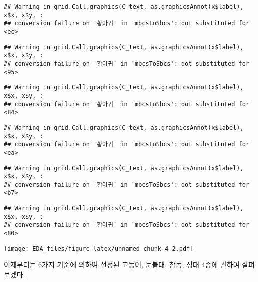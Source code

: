 \documentclass[
]{article}
\begin{document}
\begin{verbatim}
## Warning in grid.Call.graphics(C_text, as.graphicsAnnot(x$label), x$x, x$y, :
## conversion failure on '황아귀' in 'mbcsToSbcs': dot substituted for <ec>
\end{verbatim}

\begin{verbatim}
## Warning in grid.Call.graphics(C_text, as.graphicsAnnot(x$label), x$x, x$y, :
## conversion failure on '황아귀' in 'mbcsToSbcs': dot substituted for <95>
\end{verbatim}

\begin{verbatim}
## Warning in grid.Call.graphics(C_text, as.graphicsAnnot(x$label), x$x, x$y, :
## conversion failure on '황아귀' in 'mbcsToSbcs': dot substituted for <84>
\end{verbatim}

\begin{verbatim}
## Warning in grid.Call.graphics(C_text, as.graphicsAnnot(x$label), x$x, x$y, :
## conversion failure on '황아귀' in 'mbcsToSbcs': dot substituted for <ea>
\end{verbatim}

\begin{verbatim}
## Warning in grid.Call.graphics(C_text, as.graphicsAnnot(x$label), x$x, x$y, :
## conversion failure on '황아귀' in 'mbcsToSbcs': dot substituted for <b7>
\end{verbatim}

\begin{verbatim}
## Warning in grid.Call.graphics(C_text, as.graphicsAnnot(x$label), x$x, x$y, :
## conversion failure on '황아귀' in 'mbcsToSbcs': dot substituted for <80>
\end{verbatim}

\texttt{[image: EDA\_files/figure-latex/unnamed-chunk-4-2.pdf]}

이제부터는 6가지 기준에 의하여 선정된 고등어, 눈볼대, 참돔, 성대 4종에
관하여 살펴보겠다.
\end{document}

